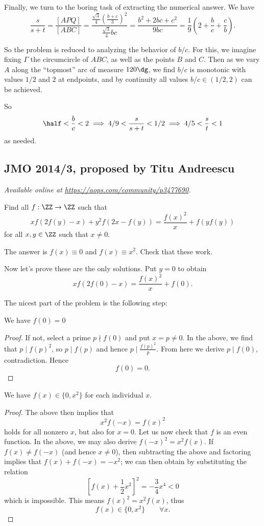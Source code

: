 \documentclass[11pt]{scrartcl}
\begin{document}
Finally, we turn to the boring task of
extracting the numerical answer.
We have
\[ \frac{s}{s+t} = \frac{[APQ]}{[ABC]}
  = \frac{\frac{\sqrt3}4 \left( \frac{b+c}{3} \right)^2}%
  {\frac{\sqrt3}4 bc}
  = \frac{b^2+2bc+c^2}{9bc}
  = \frac19 \left( 2 + \frac bc + \frac cb \right). \]

So the problem is reduced to analyzing the behavior of $b/c$.
For this, we imagine fixing $\Gamma$ the circumcircle of $ABC$,
as well as the points $B$ and $C$.
Then as we vary $A$ along the ``topmost'' arc of measure $120\dg$,
we find $b/c$ is monotonic with values $1/2$ and $2$ at endpoints,
and by continuity all values $b/c \in (1/2,2)$ can be achieved.

So \[ \half < \frac bc < 2
  \implies 4/9 < \frac{s}{s+t} < 1/2
  \implies 4/5 < \frac st < 1 \]
as needed.
\pagebreak

\subsection{JMO 2014/3, proposed by Titu Andreescu}
\textsl{Available online at \url{https://aops.com/community/p3477690}.}
\begin{mdframed}[style=mdpurplebox,frametitle={Problem statement}]
Find all $f :\ZZ \to \ZZ$ such that
\[
  xf\left( 2f(y)-x \right) + y^2f\left( 2x-f(y) \right)
  = \frac{f(x)^2}{x} + f\left( yf(y) \right)
\]
for all $x,y \in \ZZ$ such that $x \neq 0$.
\end{mdframed}
The answer is $f(x) \equiv 0$ and $f(x) \equiv x^2$. Check that these work.

Now let's prove these are the only solutions.
Put $y=0$ to obtain
\[ x f\left( 2f(0)-x \right) = \frac{f(x)^2}{x} + f(0).  \]

The nicest part of the problem is the following step:
\begin{claim*}
  We have $f(0)=0$
\end{claim*}
\begin{proof}
  If not, select a prime $p \nmid f(0)$ and put $x=p \neq 0$.
  In the above, we find that $p \mid f(p)^2$,
  so $p \mid f(p)$ and hence $p \mid \tfrac{f(p)^2}{p}$.
  From here we derive $p \mid f(0)$, contradiction.
  Hence \[ f(0) = 0. \]
\end{proof}

\begin{claim*}
  We have $f(x) \in \{0,x^2\}$ for each individual $x$.
\end{claim*}
\begin{proof}
  The above then implies that
  \[ x^2f(-x) = f(x)^2 \]
  holds for all nonzero $x$, but also for $x=0$.
  Let us now check that $f$ is an even function.
  In the above, we may also derive $f(-x)^2 = x^2f(x)$.
  If $f(x) \neq f(-x)$ (and hence $x \neq 0$),
  then subtracting the above and factoring implies that
  $f(x) + f(-x) = -x^2$;
  we can then obtain by substituting the relation
  \[ \left[ f(x) + \frac 12x^2 \right]^2 = -\frac 34 x^4 < 0 \]
  which is impossible.
  This means $f(x)^2 = x^2f(x)$, thus
  \[ f(x) \in \{0, x^2\} \qquad \forall x. \]
\end{proof}
\end{document}
